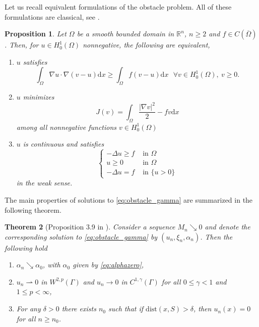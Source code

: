 \documentclass[10pt,a4paper]{article}
\newcommand{\RR}{\mathbb{R}}
\newcommand{\faskip}{\hspace{8pt}}
\newtheorem{thm}{Theorem}[section]
\newtheorem{prop}[thm]{Proposition}
\numberwithin{equation}{section}
\begin{document}
Let us recall equivalent formulations of the obstacle problem. All of these formulations are classical, see \cite{FRRO22}. 
\begin{prop}
	Let $ \Omega $ be a smooth bounded domain in $ \RR^{n} $, $n\geq 2$ and $ f \in C(\overline{\Omega}) $. Then, for $ u \in H_0^{1} (\Omega)$ nonnegative, the following are equivalent,
	\begin{enumerate}
		\item $ u $ satisfies
			\[\int_{\Omega} \nabla u \cdot \nabla(v - u) \mathrm{d}x \geq \int_{\Omega} f(v-u) \mathrm{d}x \faskip \forall v \in H_0^{1}(\Omega), ~ v\geq 0.  \]  
		\item $ u $ minimizes 
		\[J(v) = \int_{\Omega} \frac{|\nabla v|^2}{2} - fv \mathrm{d}x\]
		among all nonnegative functions $ v \in H^{1}_0(\Omega) $
		\item $ u $ is continuous and satisfies  
		\[
		\begin{cases}
			-\Delta u \geq f & \text{ in } \Omega \\
			u \geq 0 & \text{ in } \Omega\\
			-\Delta u = f & \text{ in } \{u > 0\} 
		\end{cases}
		\]
		in the weak sense.
	\end{enumerate}
\end{prop}
The main properties of solutions to \eqref{eq:obstacle_gamma} are summarized in the following theorem.
\begin{thm}[Proposition 3.9 in \cite{NRV20}]
	\label{thm:known}
	Consider a sequence $M_n \searrow 0$ and denote the corresponding solution to  \eqref{eq:obstacle_gamma} by $(u_n, \xi_n, \alpha_n)$. Then the following hold
\begin{enumerate}
	\item $ \alpha_n \searrow \alpha_0 $, with $\alpha_0$ given by \eqref{eq:alphazero},
	\item $ u_n \rightharpoonup 0 $ in $ W^{2,p}(\Gamma) $ and $ u_n \rightarrow 0 $ in $ C^{1,\gamma}(\Gamma) $ for all $0 \leq \gamma <1$ and $1\leq p <\infty$,
	\item For any $\delta > 0$ there exists $n_0$ such that if $ \mathrm{dist}(x, S) > \delta $, then $ u_n(x) = 0 $ for all $n\geq n_0$.
\end{enumerate}	
\end{thm}
\end{document}
